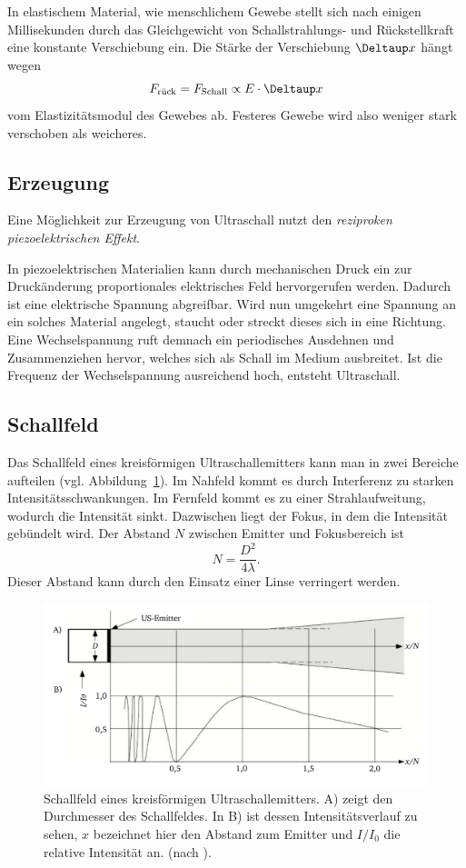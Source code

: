 \documentclass[
    11pt,
    ngerman
]{scrbook}
\begin{document}
In elastischem Material, wie menschlichem Gewebe stellt sich nach einigen Millisekunden durch das Gleichgewicht von Schallstrahlungs- und Rückstellkraft  eine konstante Verschiebung ein. Die Stärke der Verschiebung $\Deltaup x$ hängt wegen 
\[
    F_\text{rück} = F_\text{Schall} \propto E\cdot\Deltaup x
\]
vom Elastizitätsmodul des Gewebes ab. Festeres Gewebe wird also weniger stark verschoben als weicheres.


\subsection{Erzeugung}

Eine Möglichkeit zur Erzeugung von Ultraschall nutzt den
\emph{reziproken piezoelektrischen Effekt}.

In piezoelektrischen Materialien kann durch mechanischen Druck ein zur
Druckänderung proportionales elektrisches Feld hervorgerufen werden. Dadurch
ist eine elektrische Spannung abgreifbar. Wird nun umgekehrt eine Spannung an
ein solches Material angelegt, staucht oder streckt dieses sich in eine
Richtung. Eine Wechselspannung ruft demnach ein periodisches Ausdehnen und
Zusammenziehen hervor, welches sich als Schall im Medium ausbreitet. Ist die
Frequenz der Wechselspannung ausreichend hoch, entsteht Ultraschall.

\subsection{Schallfeld}

Das Schallfeld eines kreisförmigen Ultraschallemitters kann man in zwei Bereiche aufteilen (vgl. Abbildung~\ref{fig:us-feld}). Im Nahfeld kommt es durch Interferenz zu starken Intensitätsschwankungen. Im Fernfeld kommt es zu einer Strahlaufweitung, wodurch die Intensität sinkt. Dazwischen liegt der Fokus, in dem die Intensität gebündelt wird. Der Abstand $N$ zwischen Emitter und Fokusbereich ist
\[
    N = \frac{D^2}{4\lambda}.
\]
Dieser Abstand kann durch den Einsatz einer Linse verringert werden.

\begin{figure}[htbp]
    \centering
    \includegraphics[width=.8\textwidth]{Abbildungen/US_Feld.pdf}
    \caption{%
        Schallfeld eines kreisförmigen Ultraschallemitters. A) zeigt den Durchmesser des Schallfeldes. In B) ist dessen Intensitätsverlauf zu sehen, $x$ bezeichnet hier den Abstand zum Emitter und $I/I_0$ die relative Intensität an. (nach \parencite{bildgebende_verfahren}).
    }
    \label{fig:us-feld}
\end{figure}
\end{document}
